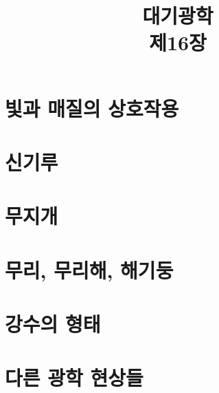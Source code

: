 \title[]{대기광학\\\small{제16장}}

\begin{frame}[plain] %
	\titlepage
\end{frame}


\section{빛과 매질의 상호작용}


\section{신기루}

\section{무지개}

\section{무리, 무리해, 해기둥}

\section{강수의 형태}

\section{다른 광학 현상들}

